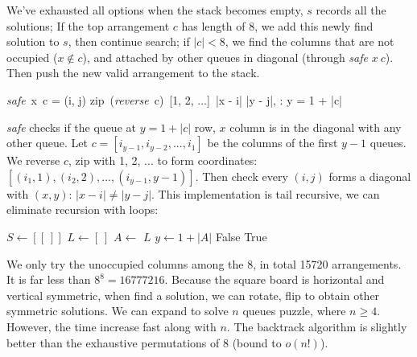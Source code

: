 \documentclass[b5paper]{article}
\begin{document}
We've exhausted all options when the stack becomes empty, $s$ records all the solutions; If the top arrangement $c$ has length of 8, we add this newly find solution to $s$, then continue search; if $|c| < 8$, we find the columns that are not occupied ($x \notin c$), and attached by other queues in diagonal (through \textit{safe} $x\ c$). Then push the new valid arrangement to the stack.

\be
\textit{safe}\ x\ c = \forall (i, j) \gets zip\ (\textit{reverse}\ c)\ [1, 2, ...]\ \Rightarrow |x - i| \neq |y - j|, : y = 1 + |c|
\ee

\textit{safe} checks if the queue at $y = 1 + |c|$ row, $x$ column is in the diagonal with any other queue. Let $c = [i_{y-1}, i_{y-2}, ..., i_1]$ be the columns of the first $y - 1$ queues. We reverse $c$, zip with 1, 2, ... to form coordinates: $[(i_1, 1), (i_2, 2), ..., (i_{y-1}, y-1)]$. Then check every $(i, j)$ forms a diagonal with $(x, y)$: $|x - i| \neq |y - j|$. This implementation is tail recursive, we can eliminate recursion with loops:

\begin{algorithmic}[1]
  \State $S \gets [[\ ]]$
  \State $L \gets [\ ]$ 
    \State $A \gets$  
      \State {}
    \Else
          \State {}
        \EndIf
      \EndFor
    \EndIf
  \EndWhile
  \State \Return $L$
\EndFunction
\Statex
{}
  \State $y \gets 1 + |A|$
      \State \Return False
    \EndIf
  \EndFor
  \State \Return True
\EndFunction
\end{algorithmic}

We only try the unoccupied columns among the 8, in total 15720 arrangements. It is far less than $8^8 = 16777216$\cite{wiki-8-queens}. Because the square board is horizontal and vertical symmetric, when find a solution, we can rotate, flip to obtain other symmetric solutions. We can expand to solve $n$ queues puzzle, where $n \geq 4$. However, the time increase fast along with $n$. The backtrack algorithm is slightly better than the exhaustive permutations of 8 (bound to $o(n!)$).

\begin{Exercise}\label{ex:queens-puzzle}

\end{Exercise}
\end{document}
